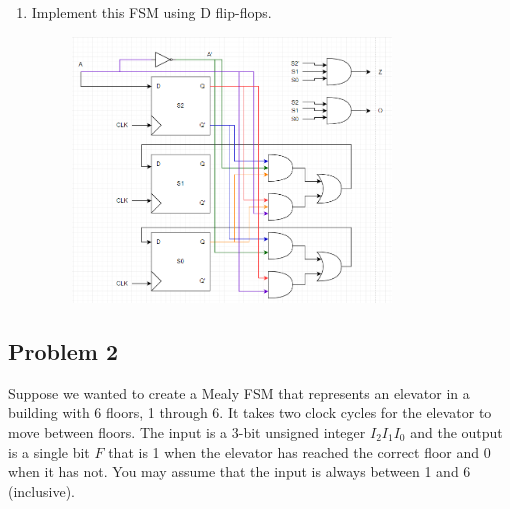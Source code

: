 \documentclass{article}
\begin{document}
\begin{enumerate}[label=\alph*.]
\item Implement this FSM using D flip-flops.
\begin{figure}[!h]
    \centering
    \includegraphics[width=0.8\textwidth]{figures/fsm1e-solution.png}
\end{figure}
\end{enumerate}

\newpage
\subsection*{Problem 2}

Suppose we wanted to create a Mealy FSM that represents an elevator in a building with 6 floors, 1 through 6. It takes two clock cycles for the elevator to move between floors. The input is a 3-bit unsigned integer $I_2I_1I_0$ and the output is a single bit $F$ that is 1 when the elevator has reached the correct floor and 0 when it has not. You may assume that the input is always between 1 and 6 (inclusive).
\end{document}
